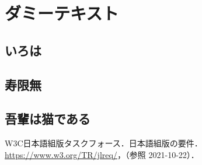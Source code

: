 \documentclass[uplatex, dvipdfmx, fonts=default]{acproceedings}
\begin{document}
\section{ダミーテキスト}

\subsection{いろは}


\subsection{寿限無}


\subsection{吾輩は猫である}


\begin{thebibliography}{9}
	\small
	W3C日本語組版タスクフォース．日本語組版の要件．
	\url{https://www.w3.org/TR/jlreq/}，（参照 2021-10-22）．
\end{thebibliography}
\end{document}
